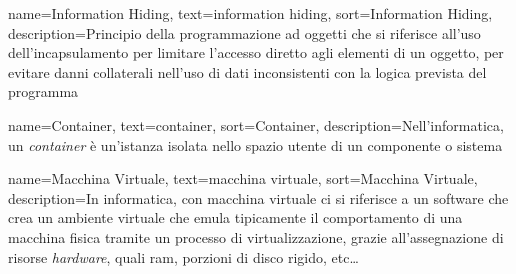 {
    name=Information Hiding,
    text=information hiding,
    sort=Information Hiding,
    description={Principio della programmazione ad oggetti che si riferisce all'uso dell'incapsulamento per limitare l'accesso diretto agli elementi di un oggetto, per evitare danni collaterali nell'uso di dati inconsistenti con la logica prevista del programma}
}

{
    name=Container,
    text=container,
    sort=Container,
    description={Nell'informatica, un \emph{container} è un'istanza isolata nello spazio utente di un componente o sistema}
}

{
    name=Macchina Virtuale,
    text=macchina virtuale,
    sort=Macchina Virtuale,
    description={In informatica, con macchina virtuale ci si riferisce a un software che crea un ambiente virtuale che emula tipicamente il comportamento di una macchina fisica tramite un processo di virtualizzazione, grazie all'assegnazione di risorse \emph{hardware}, quali \gls{ram}, porzioni di disco rigido, etc\dots }
}
